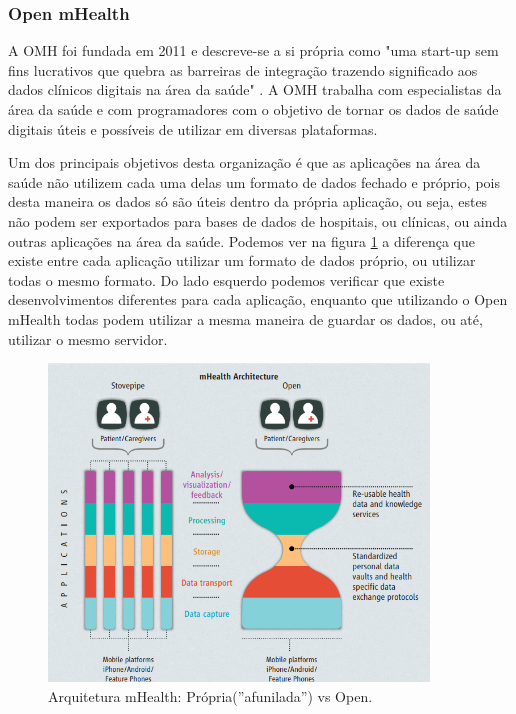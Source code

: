 \subsubsection{Open mHealth}

A \gls{OMH} foi fundada em 2011 e descreve-se a si própria como "uma start-up sem fins lucrativos que quebra as barreiras de integração trazendo significado aos dados clínicos digitais na área da saúde" \cite{omhabout}. A \gls{OMH} trabalha com especialistas da área da saúde e com programadores com o objetivo de tornar os dados de saúde digitais úteis e possíveis de utilizar em diversas plataformas. 
\par 
Um dos principais objetivos desta organização é que as aplicações na área da saúde não utilizem cada uma delas um formato de dados fechado e próprio, pois desta maneira os dados só são úteis dentro da própria aplicação, ou seja, estes não podem ser exportados para bases de dados de hospitais, ou clínicas, ou ainda outras aplicações na área da saúde. Podemos ver na figura \ref{f:omharch} a diferença que existe entre cada aplicação utilizar um formato de dados próprio, ou utilizar todas o mesmo formato\cite{omharticle}. Do lado esquerdo podemos verificar que existe desenvolvimentos diferentes para cada aplicação, enquanto que utilizando o Open mHealth todas podem utilizar a mesma maneira de guardar os dados, ou até, utilizar o mesmo servidor.

\begin{figure}[!ht]
  \centering
  \includegraphics[width=0.9\textwidth]{imgs/openmharch.png}
  \caption[Arquitetura mHealth: Própria(''afunilada'') vs Open]{Arquitetura mHealth: Própria(''afunilada'') vs Open. \cite{omharticle}}
  
  \label{f:omharch}
\end{figure}

